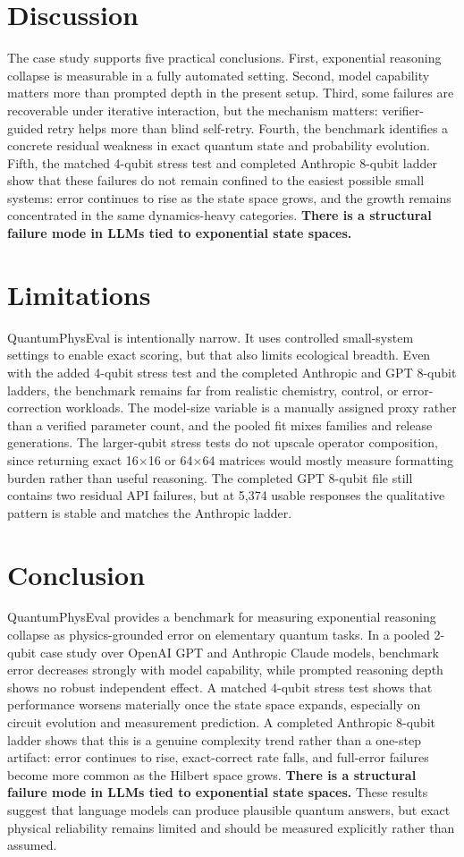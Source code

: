 \documentclass[11pt]{article}
\begin{document}
\section{Discussion}
The case study supports five practical conclusions. First, exponential reasoning collapse is measurable in a fully automated setting. Second, model capability matters more than prompted depth in the present setup. Third, some failures are recoverable under iterative interaction, but the mechanism matters: verifier-guided retry helps more than blind self-retry. Fourth, the benchmark identifies a concrete residual weakness in exact quantum state and probability evolution. Fifth, the matched 4-qubit stress test and completed Anthropic 8-qubit ladder show that these failures do not remain confined to the easiest possible small systems: error continues to rise as the state space grows, and the growth remains concentrated in the same dynamics-heavy categories. \textbf{There is a structural failure mode in LLMs tied to exponential state spaces.}

\section{Limitations}
QuantumPhysEval is intentionally narrow. It uses controlled small-system settings to enable exact scoring, but that also limits ecological breadth. Even with the added 4-qubit stress test and the completed Anthropic and GPT 8-qubit ladders, the benchmark remains far from realistic chemistry, control, or error-correction workloads. The model-size variable is a manually assigned proxy rather than a verified parameter count, and the pooled fit mixes families and release generations. The larger-qubit stress tests do not upscale operator composition, since returning exact 16$\times$16 or 64$\times$64 matrices would mostly measure formatting burden rather than useful reasoning. The completed GPT 8-qubit file still contains two residual API failures, but at 5{,}374 usable responses the qualitative pattern is stable and matches the Anthropic ladder.

\section{Conclusion}
QuantumPhysEval provides a benchmark for measuring exponential reasoning collapse as physics-grounded error on elementary quantum tasks. In a pooled 2-qubit case study over OpenAI GPT and Anthropic Claude models, benchmark error decreases strongly with model capability, while prompted reasoning depth shows no robust independent effect. A matched 4-qubit stress test shows that performance worsens materially once the state space expands, especially on circuit evolution and measurement prediction. A completed Anthropic 8-qubit ladder shows that this is a genuine complexity trend rather than a one-step artifact: error continues to rise, exact-correct rate falls, and full-error failures become more common as the Hilbert space grows. \textbf{There is a structural failure mode in LLMs tied to exponential state spaces.} These results suggest that language models can produce plausible quantum answers, but exact physical reliability remains limited and should be measured explicitly rather than assumed.
\end{document}
